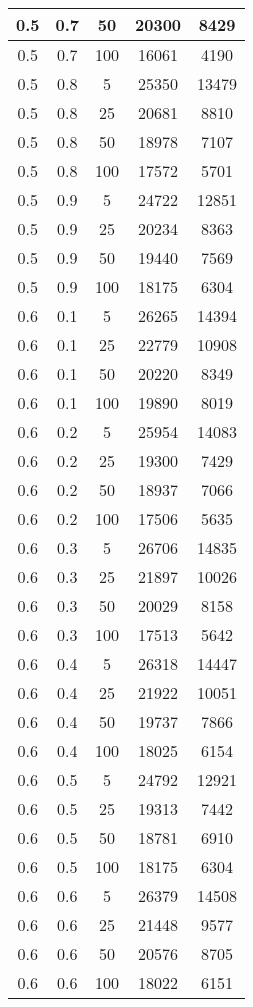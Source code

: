 \begin{appendices}
\begin{longtable}[c]{|c|c|c|c|c|}
	\hline
	0.5& 0.7& 50& 20300&  8429\\
	\hline
	0.5& 0.7& 100& 16061&  4190\\
	\hline
	0.5& 0.8& 5& 25350&  13479\\
	\hline
	0.5& 0.8& 25& 20681&  8810\\
	\hline
	0.5& 0.8& 50& 18978&  7107\\
	\hline
	0.5& 0.8& 100& 17572&  5701\\
	\hline
	0.5& 0.9& 5& 24722&  12851\\
	\hline
	0.5& 0.9& 25& 20234&  8363\\
	\hline
	0.5& 0.9& 50& 19440&  7569\\
	\hline
	0.5& 0.9& 100& 18175&  6304\\
	\hline
	0.6& 0.1& 5& 26265&  14394\\
	\hline
	0.6& 0.1& 25& 22779&  10908\\
	\hline
	0.6& 0.1& 50& 20220&  8349\\
	\hline
	0.6& 0.1& 100& 19890&  8019\\
	\hline
	0.6& 0.2& 5& 25954&  14083\\
	\hline
	0.6& 0.2& 25& 19300&  7429\\
	\hline
	0.6& 0.2& 50& 18937&  7066\\
	\hline
	0.6& 0.2& 100& 17506&  5635\\
	\hline
	0.6& 0.3& 5& 26706&  14835\\
	\hline
	0.6& 0.3& 25& 21897&  10026\\
	\hline
	0.6& 0.3& 50& 20029&  8158\\
	\hline
	0.6& 0.3& 100& 17513&  5642\\
	\hline
	0.6& 0.4& 5& 26318&  14447\\
	\hline
	0.6& 0.4& 25& 21922&  10051\\
	\hline
	0.6& 0.4& 50& 19737&  7866\\
	\hline
	0.6& 0.4& 100& 18025&  6154\\
	\hline
	0.6& 0.5& 5& 24792&  12921\\
	\hline
	0.6& 0.5& 25& 19313&  7442\\
	\hline
	0.6& 0.5& 50& 18781&  6910\\
	\hline
	0.6& 0.5& 100& 18175&  6304\\
	\hline
	0.6& 0.6& 5& 26379&  14508\\
	\hline
	0.6& 0.6& 25& 21448&  9577\\
	\hline
	0.6& 0.6& 50& 20576&  8705\\
	\hline
	0.6& 0.6& 100& 18022&  6151\\

\end{longtable}
\end{appendices}
